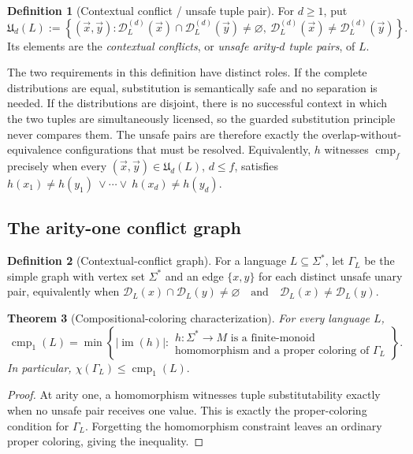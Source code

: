 \documentclass[10pt,a4paper]{article}
\newtheorem{theorem}{Theorem}[section]
\theoremstyle{definition}
\newtheorem{definition}[theorem]{Definition}
\theoremstyle{remark}
\newcommand{\cmp}{\operatorname{cmp}}
\newcommand{\D}{\mathcal D}
\begin{document}
\begin{definition}[Contextual conflict / unsafe tuple pair]
For \(d\ge1\), put
\(\mathfrak U_d(L) :=\left\{ (\vec x,\vec y): \D_L^{(d)}(\vec x)\cap\D_L^{(d)}(\vec y)\neq\varnothing, \ \D_L^{(d)}(\vec x)\neq\D_L^{(d)}(\vec y) \right\}.\)
Its elements are the \emph{contextual conflicts}, or \emph{unsafe
arity-\(d\) tuple pairs}, of \(L\).
\end{definition}

The two requirements in this definition have distinct roles. If the
complete distributions are equal, substitution is semantically safe and no
separation is needed. If the distributions are disjoint, there is no
successful context in which the two tuples are simultaneously licensed, so
the guarded substitution principle never compares them. The unsafe pairs are
therefore exactly the overlap-without-equivalence configurations that must be
resolved. Equivalently, \(h\) witnesses \(\cmp_f\) precisely when every
\((\vec x,\vec y)\in\mathfrak U_d(L)\), \(d\le f\), satisfies \(h(x_1)\neq h(y_1)\ \vee\cdots\vee\ h(x_d)\neq h(y_d).\) 

\subsection{The arity-one conflict graph}

\begin{definition}[Contextual-conflict graph]
For a language \(L\subseteq\Sigma^*\), let \(\Gamma_L\) be the simple
graph with vertex set \(\Sigma^*\) and an edge \(\{x,y\}\) for each
distinct unsafe unary pair, equivalently when
\(
\D_L(x)\cap\D_L(y)\neq\varnothing
\quad\text{and}\quad
\D_L(x)\neq\D_L(y).
\)
\end{definition}

\begin{theorem}[Compositional-coloring characterization]
\label{conf:thm:coloring}
For every language \(L\),
\[
\cmp_1(L)
=
\min\left\{
|\operatorname{im}(h)|:
\begin{array}{l}
h:\Sigma^*\to M\text{ is a finite-monoid}\\
\text{homomorphism and a proper coloring of }\Gamma_L
\end{array}
\right\}.
\]
In particular, \(\chi(\Gamma_L)\le\cmp_1(L).\) \end{theorem}

\begin{proof}
At arity one, a homomorphism witnesses tuple substitutability exactly when no
unsafe pair receives one value. This is exactly the proper-coloring condition
for \(\Gamma_L\). Forgetting the homomorphism constraint leaves an ordinary
proper coloring, giving the inequality.
\end{proof}
\end{document}
